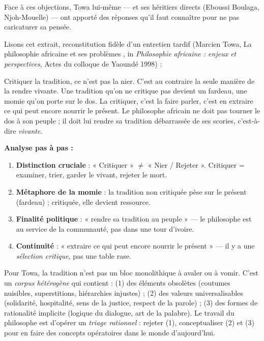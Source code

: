 \documentclass[11pt]{article}
\begin{document}
Face à ces objections, Towa lui-même — et ses héritiers directs (Eboussi Boulaga, Njoh-Mouelle) — ont apporté des réponses qu'il faut connaître pour ne pas caricaturer sa pensée.

\begin{experience}
Lisons cet extrait, reconstitution fidèle d'un entretien tardif (Marcien Towa, \guillemotleft La philosophie africaine et ses problèmes \guillemotright, in \emph{Philosophie africaine : enjeux et perspectives}, Actes du colloque de Yaoundé 1998) :

\guillemotleft Critiquer la tradition, ce n'est pas la nier. C'est au contraire la seule manière de la rendre vivante. Une tradition qu'on ne critique pas devient un fardeau, une momie qu'on porte sur le dos. La critiquer, c'est la faire parler, c'est en extraire ce qui peut encore nourrir le présent. Le philosophe africain ne doit pas tourner le dos à son peuple ; il doit lui rendre sa tradition débarrassée de ses scories, c'est-à-dire \emph{vivante}. \guillemotright

\medskip
\textbf{Analyse pas à pas :}
\begin{enumerate}
\item \textbf{Distinction cruciale} : « Critiquer » $\neq$ « Nier / Rejeter ». Critiquer = examiner, trier, garder le vivant, rejeter le mort.
\item \textbf{Métaphore de la momie} : la tradition non critiquée pèse sur le présent (fardeau) ; critiquée, elle devient ressource.
\item \textbf{Finalité politique} : « rendre sa tradition au peuple » — le philosophe est au service de la communauté, pas dans une tour d'ivoire.
\item \textbf{Continuité} : « extraire ce qui peut encore nourrir le présent » — il y a une \emph{sélection critique}, pas une table rase.
\end{enumerate}
\end{experience}

\begin{propriete}
Pour Towa, la tradition n'est pas un bloc monolithique à avaler ou à vomir. C'est un \emph{corpus hétérogène} qui contient : (1) des éléments obsolètes (coutumes nuisibles, superstitions, hiérarchies injustes) ; (2) des valeurs universalisables (solidarité, hospitalité, sens de la justice, respect de la parole) ; (3) des formes de rationalité implicite (logique du dialogue, art de la palabre). Le travail du philosophe est d'opérer un \emph{triage rationnel} : rejeter (1), conceptualiser (2) et (3) pour en faire des concepts opératoires dans le monde d'aujourd'hui.
\end{propriete}
\end{document}
